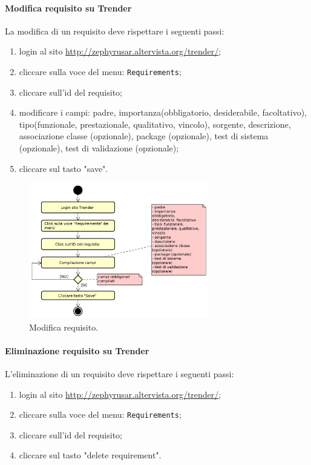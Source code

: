 		\paragraph{Modifica requisito su Trender}
		La modifica di un requisito deve rispettare i seguenti passi:
		\begin{enumerate}
			\item login al sito \url{http://zephyrusar.altervista.org/trender/};
			\item cliccare sulla voce del menu: \texttt{Requirements};
	    	\item cliccare sull'id del requisito;	
			\item modificare i campi: padre, importanza(obbligatorio, desiderabile, facoltativo), tipo(funzionale, prestazionale, qualitativo, vincolo), sorgente, descrizione, associazione classe (opzionale), package (opzionale), test di sistema (opzionale), test di validazione (opzionale);
			\item cliccare sul tasto "save".
		\end{enumerate}
		\begin{figure}[H]
			\centering
			\includegraphics[width=0.7\textwidth]{img/ModificaReq}
			\caption{Modifica requisito.}
		\end{figure}
	
		\paragraph{Eliminazione requisito su Trender}
		L'eliminazione di un requisito deve rispettare i seguenti passi:
		\begin{enumerate}
			\item login al sito \url{http://zephyrusar.altervista.org/trender/};
			\item cliccare sulla voce del menu: \texttt{Requirements};
			\item cliccare sull'id del requisito;
			\item cliccare sul tasto "delete requirement".
		\end{enumerate}

